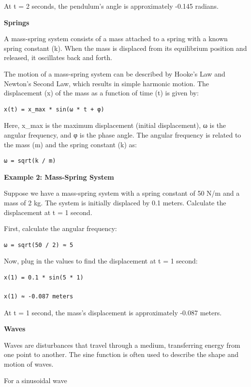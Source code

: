 \documentclass[
]{article}
\begin{document}
At t = 2 seconds, the pendulum's angle is approximately -0.145 radians.

\textbf{Springs}

A mass-spring system consists of a mass attached to a spring with a
known spring constant (k). When the mass is displaced from its
equilibrium position and released, it oscillates back and forth.

The motion of a mass-spring system can be described by Hooke's Law and
Newton's Second Law, which results in simple harmonic motion. The
displacement (x) of the mass as a function of time (t) is given by:

\begin{verbatim}
x(t) = x_max * sin(ω * t + φ)
\end{verbatim}

Here, x\_max is the maximum displacement (initial displacement), ω is
the angular frequency, and φ is the phase angle. The angular frequency
is related to the mass (m) and the spring constant (k) as:

\begin{verbatim}
ω = sqrt(k / m)
\end{verbatim}

\textbf{Example 2: Mass-Spring System}

Suppose we have a mass-spring system with a spring constant of 50 N/m
and a mass of 2 kg. The system is initially displaced by 0.1 meters.
Calculate the displacement at t = 1 second.

First, calculate the angular frequency:

\begin{verbatim}
ω = sqrt(50 / 2) ≈ 5
\end{verbatim}

Now, plug in the values to find the displacement at t = 1 second:

\begin{verbatim}
x(1) = 0.1 * sin(5 * 1)

x(1) ≈ -0.087 meters
\end{verbatim}

At t = 1 second, the mass's displacement is approximately -0.087 meters.

\textbf{Waves}

Waves are disturbances that travel through a medium, transferring energy
from one point to another. The sine function is often used to describe
the shape and motion of waves.

For a sinusoidal wave
\end{document}
